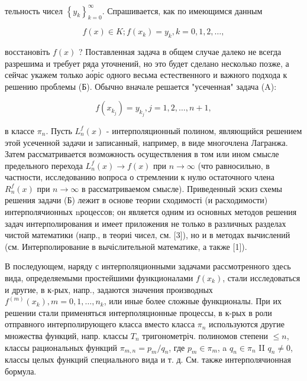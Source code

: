 \documentclass[10pt]{article}
\begin{document}
тельность чисел $\left\{y_{k}\right\}_{k=0}^{\infty}$. Спрашивается, как по имеющимся данным



\[

f(x) \in K ; f\left(x_{k}\right)=y_{k}, k=0,1,2, \ldots,

\]



восстановіть $f(x)$ ? Поставленная задача в общем случае далеко не всегда разрешима и требует ряда уточнений, но это будет сделано несколько позже, а сейчас укажем только ао́ріс одного весьма естественного и важного подхода к решению проблемы (Б). Обычно вначале решается "усеченная" задача (A):



\[

f\left(x_{k_{j}}\right)=y_{k_{j}}, j=1,2, \ldots, n+1,

\]



в классе $\pi_{n}$. Пусть $L_{n}^{f}(x)$ - интерполяционный полином, являющийся решением этой усеченной задачи и записанный, например, в виде многочлена Лагранжа. Затем рассматривается возможность осуществления в том или ином смысле предельного перехода $L_{n}^{f}(x) \rightarrow f(x)$ при $n \rightarrow \infty$ (что равносильно, в частности, исследованию вопроса о стремлении к нулю остаточного члена $R_{n}^{f}(x)$ при $n \rightarrow \infty$ в рассматриваемом смысле). Приведенный эскиз схемы решения задачи (Б) лежит в основе теории сходимості (и расходимости) интерполячионных nроцессов; он является одним из основных методов решения задач интерполирования и имеет приложения не только в различных разделах чистой математики (напр., в теориі чисел, см. [3]), но и в методах вычислений (см. Интерполирование в вычіслительной математике, а также [1]).



В последующем, наряду с интерполяционными задачами рассмотренного здесь вида, определяемыми простейшими функционалами $f\left(x_{k}\right)$, стали исследоваться и другие, в к-рых, напр., задаются значения производных $f^{(m)}\left(x_{k}\right), m=0,1, \ldots, n_{k}$, или иные более сложные функционалы. При их решении стали применяться интерполяционные процессы, в к-рых в роли отправного интерполирующего класса вместо класса $\pi_{n}$ используются другие множества функций, напр. классы $T_{n}$ тригонометріч. полиномов степени $\leqslant n$, классы рациональных функций $\pi_{m, n}=p_{m} / q_{n}$, где $p_{m} \in \pi_{m}$, a $q_{n} \in \pi_{n}$ II $q_{n} \neq 0$, классы целых функций специального вида и т. д. См. также интерполячионная бормула.
\end{document}
